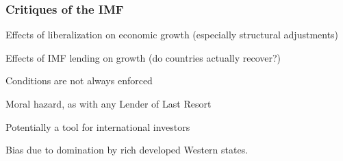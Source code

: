\documentclass{beamer}
\begin{document}
\begin{frame} 
	\frametitle{\LARGE{Critiques of the IMF}}
	\begin{itemize}
		\large{
			\item Effects of liberalization on economic growth (especially structural adjustments) \pause 

			\item Effects of IMF lending on growth (do countries actually recover?) \pause 

			\item Conditions are not always enforced \pause 

			\item Moral hazard, as with any Lender of Last Resort \pause  

			\item Potentially a tool for international investors \pause 

			\item Bias due to domination by rich developed Western states.
		}
	\end{itemize}
\end{frame}

\end{document}
